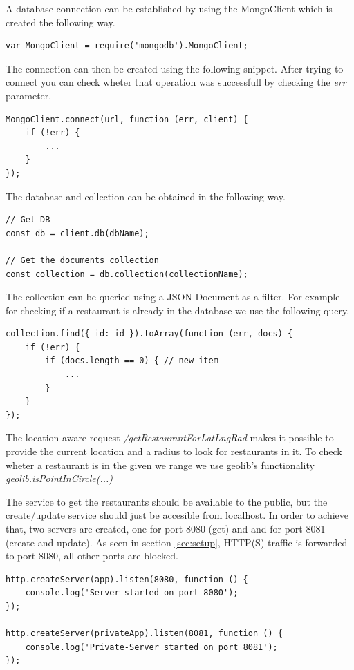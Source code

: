 A database connection can be established by using the MongoClient which is created the following way.
\begin{lstlisting}
var MongoClient = require('mongodb').MongoClient;
\end{lstlisting} 

The connection can then be created using the following snippet. After trying to connect you can check wheter that operation was successfull by checking the \textit{err} parameter.
\begin{lstlisting}
MongoClient.connect(url, function (err, client) {
	if (!err) {
		...
	}
});
\end{lstlisting}

The database and collection can be obtained in the following way.
\begin{lstlisting}
// Get DB
const db = client.db(dbName);

// Get the documents collection
const collection = db.collection(collectionName);
\end{lstlisting}

The collection can be queried using a JSON-Document as a filter. For example for checking if a restaurant is already in the database we use the following query.
\begin{lstlisting}
collection.find({ id: id }).toArray(function (err, docs) {
	if (!err) {
		if (docs.length == 0) { // new item
			...
		} 
	}
});
\end{lstlisting}

The location-aware request \textit{/getRestaurantForLatLngRad} makes it possible to provide the current location and a radius to look for restaurants in it. To check wheter a restaurant is in the given we range we use geolib's functionality \textit{geolib.isPointInCircle(...)}

The service to get the restaurants should be available to the public, but the create/update service should just be accesible from localhost. In order to achieve that, two servers are created, one for port 8080 (get) and and for port 8081 (create and update). As seen in section \ref{sec:setup}, HTTP(S) traffic is forwarded to port 8080, all other ports are blocked.
\begin{lstlisting}
http.createServer(app).listen(8080, function () {
	console.log('Server started on port 8080');
});

http.createServer(privateApp).listen(8081, function () {
	console.log('Private-Server started on port 8081');
});
\end{lstlisting}

